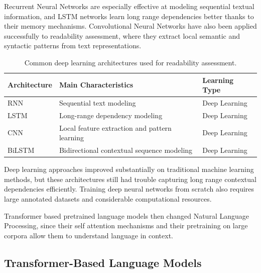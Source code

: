 \documentclass[12pt]{report}
\begin{document}
Recurrent Neural Networks are especially effective at modeling sequential textual information, and LSTM networks learn long range dependencies better thanks to their memory mechanisms. Convolutional Neural Networks have also been applied successfully to readability assessment, where they extract local semantic and syntactic patterns from text representations.

\begin{table}[H]

\centering

\caption{Common deep learning architectures used for readability assessment.}

\label{tab:deep_learning_readability}

\begin{tabular}{p{4cm} p{7cm} p{2.5cm}}

\toprule

\textbf{Architecture} & \textbf{Main Characteristics} & \textbf{Learning Type} \\

\midrule

RNN & Sequential text modeling & Deep Learning \\

LSTM & Long-range dependency modeling & Deep Learning \\

CNN & Local feature extraction and pattern learning & Deep Learning \\

BiLSTM & Bidirectional contextual sequence modeling & Deep Learning \\

\bottomrule

\end{tabular}

\end{table}

Deep learning approaches improved substantially on traditional machine learning methods, but these architectures still had trouble capturing long range contextual dependencies efficiently. Training deep neural networks from scratch also requires large annotated datasets and considerable computational resources.

Transformer based pretrained language models then changed Natural Language Processing, since their self attention mechanisms and their pretraining on large corpora allow them to understand language in context.

\subsection{Transformer-Based Language Models}
\end{document}
